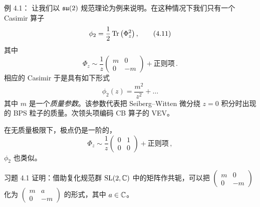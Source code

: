 \begin{examplebox}{例 4.1：}
  让我们以 $\mathfrak{su}(2)$ 规范理论为例来说明。在这种情况下我们只有一个 Casimir 算子
  \begin{equation}
    \phi_2 = \frac{1}{2}\operatorname{Tr}\left(\Phi_z^2\right),
    \tag{4.11}
  \end{equation}
  其中
  \begin{equation}
    \Phi_z \sim \frac{1}{z}
    \begin{pmatrix}
      m & 0\\
      0 & -m
    \end{pmatrix}
    + \text{正则项}\,.
    \tag{4.12}
  \end{equation}
  相应的 Casimir 于是具有如下形式
  \begin{equation}
    \phi_2(z) = \frac{m^2}{z^2} + \ldots
    \tag{4.13}
  \end{equation}
  其中 $m$ 是一个\emph{质量参数}。该参数代表把 Seiberg--Witten 微分绕 $z=0$ 积分时出现的 BPS 粒子的质量。次领头项编码 CB 算子的 VEV。

  在无质量极限下，极点仍是一阶的，
  \begin{equation}
    \Phi_z \sim \frac{1}{z}
    \begin{pmatrix}
      0 & 1\\
      0 & 0
    \end{pmatrix}
    + \text{正则项}\,,
    \tag{4.14}
  \end{equation}
  $\phi_2$ 也类似。
\end{examplebox}


\begin{exercisebox}{习题 4.1}
  证明：借助复化规范群 $\mathrm{SL}(2,\mathbb{C})$ 中的矩阵作共轭，可以把 $\begin{pmatrix} m & 0\\ 0 & -m\end{pmatrix}$ 化为 $\begin{pmatrix} m & a\\ 0 & -m\end{pmatrix}$ 的形式，其中 $a\in\mathbb{C}$。
\end{exercisebox}

